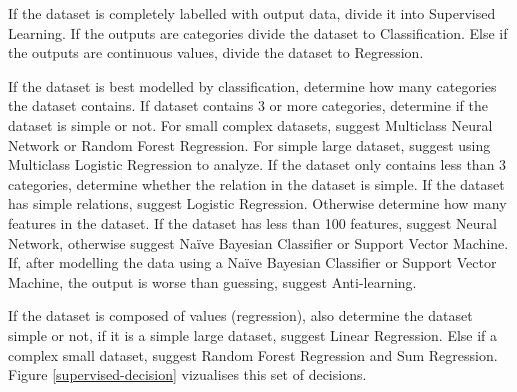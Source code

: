 \documentclass[titlepage]{article}
\begin{document}
If the dataset is completely labelled with output data, divide it into Supervised Learning. If the outputs are categories divide the dataset to Classification. Else if the outputs are continuous values, divide the dataset to Regression.

If the dataset is best modelled by classification, determine how many categories the dataset contains. If dataset contains 3 or more categories, determine if the dataset is simple or not. For small complex datasets, suggest Multiclass Neural Network or Random Forest Regression. For simple large dataset, suggest using Multiclass Logistic Regression to analyze. If the dataset only contains less than 3 categories, determine whether the relation in the dataset is simple. If the dataset has simple relations, suggest Logistic Regression. Otherwise determine how many features in the dataset. If the dataset has less than 100 features, suggest Neural Network, otherwise suggest Naïve Bayesian Classifier or Support Vector Machine. If, after modelling the data using a Naïve Bayesian Classifier or Support Vector Machine, the output is worse than guessing, suggest Anti-learning.

If the dataset is composed of values (regression), also determine the dataset simple or not, if it is a simple large dataset, suggest Linear Regression. Else if a complex small dataset, suggest Random Forest Regression and Sum Regression. Figure \ref{supervised-decision} vizualises this set of decisions.
\end{document}
